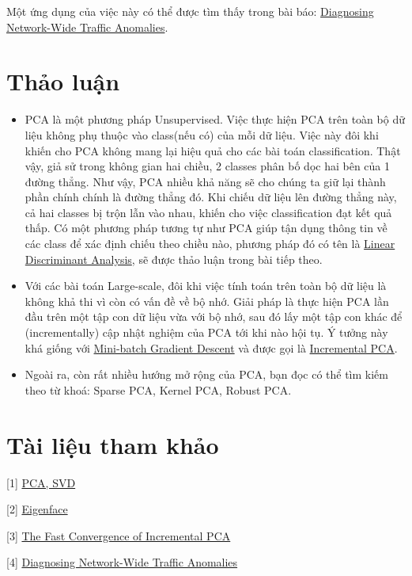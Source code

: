  
Một ứng dụng của việc này có thể được tìm thấy trong bài báo: \href{http://www.cs.bu.edu/fac/crovella/paper-archive/sigc04-network-wide-anomalies.pdf}{Diagnosing Network-Wide Traffic Anomalies}. 
 
 
\section{Thảo luận}
\begin{itemize}
\item PCA là một phương pháp Unsupervised. Việc thực hiện PCA trên toàn bộ dữ liệu không phụ thuộc vào class(nếu có) của mỗi dữ liệu. Việc này đôi khi khiến cho PCA không mang lại hiệu quả cho các bài toán classification. Thật vậy, giả sử trong không gian hai chiều, 2 classes phân bố dọc hai bên của 1 đường thẳng. Như vậy, PCA nhiều khả năng sẽ cho chúng ta giữ lại thành phần chính chính là đường thẳng đó. Khi chiếu dữ liệu lên đường thẳng này, cả hai classes bị trộn lẫn vào nhau, khiến cho việc classification đạt kết quả thấp. Có một phương pháp tương tự như PCA giúp tận dụng thông tin về các class để xác định chiếu theo chiều nào, phương pháp đó có tên là \href{https://en.wikipedia.org/wiki/Linear_discriminant_analysis}{Linear Discriminant Analysis}, sẽ được thảo luận trong bài tiếp theo. 
 
\item Với các bài toán Large-scale, đôi khi việc tính toán trên toàn bộ dữ liệu là không khả thi vì còn có vấn đề về bộ nhớ. Giải pháp là thực hiện PCA lần đầu trên một tập con dữ liệu vừa với bộ nhớ, sau đó lấy một tập con khác để (incrementally) cập nhật nghiệm của PCA tới khi nào hội tụ. Ý tưởng này khá giống với \href{http://machinelearningcoban.com/2017/01/16/gradientdescent2/#-mini-batch-gradient-descent}{Mini-batch Gradient Descent} và được gọi là \href{http://cseweb.ucsd.edu/~dasgupta/papers/incremental-pca.pdf}{Incremental PCA}. 
 
\item Ngoài ra, còn rất nhiều hướng mở rộng của PCA, bạn đọc có thể tìm kiếm theo từ khoá: Sparse PCA, Kernel PCA, Robust PCA. 
\end{itemize}
 
 
\section{Tài liệu tham khảo}
[1] \href{https://www.youtube.com/watch?v=F-nfsSq42ow}{PCA, SVD} 
 
[2] \href{https://en.wikipedia.org/wiki/Eigenface}{Eigenface} 
 
[3] \href{http://cseweb.ucsd.edu/~dasgupta/papers/incremental-pca.pdf}{The Fast Convergence of Incremental PCA} 
 
[4] \href{http://www.cs.bu.edu/fac/crovella/paper-archive/sigc04-network-wide-anomalies.pdf}{Diagnosing Network-Wide Traffic  Anomalies} 
 
